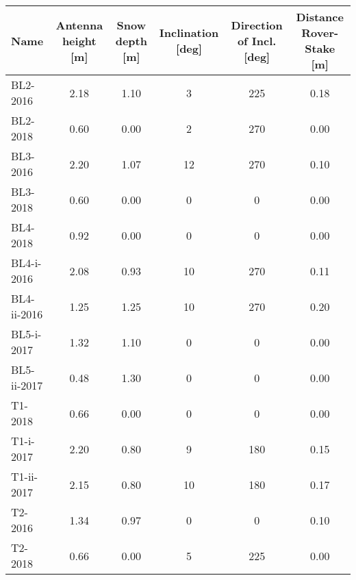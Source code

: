 \begin{tabular}{lccccc}
\toprule
        Name &  Antenna height [m] &  Snow depth [m] &  Inclination [deg] &  Direction of Incl. [deg] &  Distance Rover-Stake [m] \\
\midrule
    BL2-2016 &                2.18 &            1.10 &                  3 &                       225 &                      0.18 \\
    BL2-2018 &                0.60 &            0.00 &                  2 &                       270 &                      0.00 \\
    BL3-2016 &                2.20 &            1.07 &                 12 &                       270 &                      0.10 \\
    BL3-2018 &                0.60 &            0.00 &                  0 &                         0 &                      0.00 \\
    BL4-2018 &                0.92 &            0.00 &                  0 &                         0 &                      0.00 \\
  BL4-i-2016 &                2.08 &            0.93 &                 10 &                       270 &                      0.11 \\
 BL4-ii-2016 &                1.25 &            1.25 &                 10 &                       270 &                      0.20 \\
  BL5-i-2017 &                1.32 &            1.10 &                  0 &                         0 &                      0.00 \\
 BL5-ii-2017 &                0.48 &            1.30 &                  0 &                         0 &                      0.00 \\
     T1-2018 &                0.66 &            0.00 &                  0 &                         0 &                      0.00 \\
   T1-i-2017 &                2.20 &            0.80 &                  9 &                       180 &                      0.15 \\
  T1-ii-2017 &                2.15 &            0.80 &                 10 &                       180 &                      0.17 \\
     T2-2016 &                1.34 &            0.97 &                  0 &                         0 &                      0.10 \\
     T2-2018 &                0.66 &            0.00 &                  5 &                       225 &                      0.00 \\

\end{tabular}
